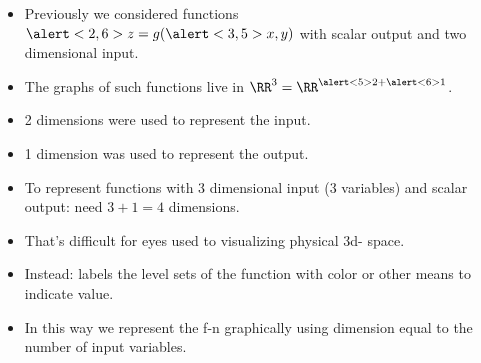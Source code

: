 \begin{frame}
\begin{itemize}
\item<1-> Previously we considered functions $\alert<2,6>{z}= g(\alert<3,5>{x,y})$  \alert<2>{with scalar output} and \alert<3>{two dimensional input}.
\item<4-> The graphs of such functions live in $\RR^3 = \RR^{\alert<5>{2} +\alert<6>{1}}$.
\item<5-> \alert<5>{2 dimensions} were used to represent the input.
\item<6-> \alert<6>{1 dimension} was used to represent the output.
\item<7-> To represent functions with 3 dimensional input (3 variables) and scalar output: need  $3+1=4$ dimensions.
\item<8-> That's difficult for eyes used to visualizing physical 3d- space.
\item<9-> Instead: labels the level sets of the function with color or other means to indicate value.
\item<10-> In this way we represent the f-n graphically using dimension equal to the number of input variables.
\end{itemize}
\end{frame}
